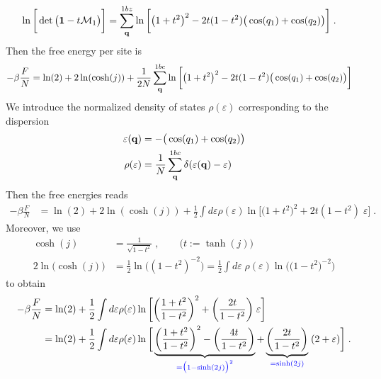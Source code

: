%
\begin{align*}
\ln
\bigg[
\det \big(
\mathbf 1- t {\cal M}_{1} 
\big)\bigg] &=\sum_{\mathbf q}^{1bz}
\ln
\bigg[ 
\big( 1+t^{2} \big)^{2}
-2t (1-t^{2}) 
\big( \cos(q_{1})+\cos(q_{2})
\big) 
\bigg]\;.
\end{align*}
%
Then the free energy per site is 
%
\begin{align}\label{eq:}
-\beta\frac{F}{N} &= \ln(2) + 2\ln(\cosh(j)) +\frac{1}{2N}\sum_{\mathbf q}^{1bc}
\ln\bigg[ \big( 1+t^{2} \big)^{2}-2t (1-t^{2}) \big( \cos(q_{1})+\cos(q_{2}) \big) \bigg]
\end{align}
%
We introduce the normalized density of states $\rho(\varepsilon)$ corresponding to the dispersion
%
\begin{align}\label{eq:ising:dispersion}
 \varepsilon(\mathbf q) &= - \big( \cos(q_{1})+\cos(q_{2} ) \big) \\
 \rho(\varepsilon) &= \frac{1}{N}\sum_{\mathbf q}^{1bc} \delta(\varepsilon(\mathbf q) - \varepsilon)
\end{align}
%
Then the free  energies reads
%
\begin{align}\label{eq:}
-\beta\frac{F}{N} &= \ln(2) + 2\ln(\cosh(j)) +\frac{1}{2}\int d\varepsilon \rho(\varepsilon)
\ln\big[ \big( 1+t^{2} \big)^{2}+2t (1-t^{2}) \;\varepsilon \big]\;.
\end{align}
%
Moreover, we use
%
\begin{align*}
\cosh(j) &=\frac{1}{\sqrt{1-t^{2}}}\;,\qquad \big(t:=\tanh(j)\big)\\
2 \ln\big(  \cosh(j)\big) &= \frac{1}{2}\ln\big( (1-t^{2})^{-2} \big)
= \frac{1}{2} \int d\varepsilon\; \rho(\varepsilon)  \ln\big(\big( 1-t^{2} \big)^{-2}\big)
\end{align*}
%
to obtain
\begin{align*}
-\beta\frac{F}{N} &= \ln(2) +\frac{1}{2}\int d\varepsilon \rho(\varepsilon)
\ln\bigg[ \bigg( \frac{1+t^{2}}{1-t^{2}} \bigg)^{2}+ \bigg(\frac{2t}{1-t^{2}}\bigg) \;\varepsilon\bigg]\\
&= \ln(2) +\frac{1}{2}\int d\varepsilon \rho(\varepsilon)
\ln\bigg[\underbrace{
 \bigg( \frac{1+t^{2}}{1-t^{2}} \bigg)^{2}-  \bigg(\frac{4t}{1-t^{2}}\bigg)
}_{\color{blue} = \big( 1-\sinh(2j) \big)^{2}}+ \underbrace{
\bigg(\frac{2t}{1-t^{2}}\bigg)
}_{\color{blue} = \sinh(2j)} \;(2+\varepsilon) \bigg]\;.
\end{align*}
%
%
